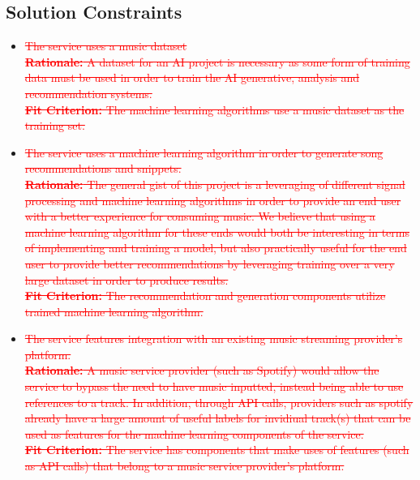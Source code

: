 \documentclass[12pt]{article}
\begin{document}
\subsection{Solution Constraints}
\begin{itemize}

  \item \textcolor{red}{\sout{The service uses a music dataset}}
  \\ \textcolor{red}{\sout{\textbf{Rationale:} A dataset for an AI project is necessary as some form of training data must be used 
  in order to train the AI generative, analysis and recommendation systems. }}
  \\ \textcolor{red}{\sout{\textbf{Fit Criterion:} The machine learning algorithms use a music dataset as the training set. }}

  \item \textcolor{red}{\sout{The service uses a machine learning algorithm in order to generate song recommendations and snippets. }}
  \\ \textcolor{red}{\sout{\textbf{Rationale:} The general gist of this project is a leveraging of different signal processing and machine learning
  algorithms in order to provide an end user with a better experience for consuming music. We believe that using a machine 
  learning algorithm for these ends would both be interesting in terms of implementing and training a model, but also practically
  useful for the end user to provide better recommendations by leveraging training over a very large dataset in order to produce results. }}
  \\\textcolor{red}{\sout{\textbf{Fit Criterion:} The recommendation and generation components utilize trained machine learning algorithm. }}

  \item \textcolor{red}{\sout{The service features integration with an existing music streaming provider's platform. }}
  \\ \textcolor{red}{\sout{\textbf{Rationale:} A music service provider (such as Spotify) would allow the service to bypass the need to have
  music inputted, instead being able to use references to a track. In addition, through API calls, providers such as spotify
  already have a large amount of useful labels for invidiual track(s) that can be used as features for the machine learning
  components of the service.  }}
  \\ \textcolor{red}{\sout{\textbf{Fit Criterion:} The service has components that make uses of features (such as API calls) 
  that belong to a music service provider's platform. }}


\end{itemize}
\end{document}
